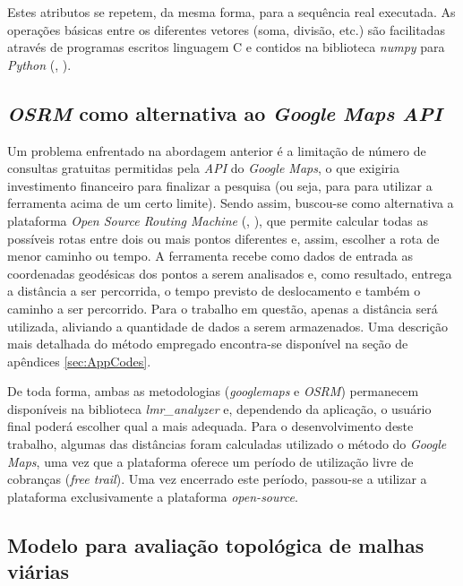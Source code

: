 Estes atributos se repetem, da mesma forma, para a sequência real executada. 
As operações básicas entre os diferentes vetores (soma, divisão, etc.) são facilitadas através de programas escritos linguagem C e contidos na biblioteca \textit{numpy} para \textit{Python} (, \citeyear{harris2020array}).

\subsection{\textit{OSRM} como alternativa ao \textit{Google Maps API}}

Um problema enfrentado na abordagem anterior é a limitação de número de consultas gratuitas permitidas pela \textit{API} do \textit{Google Maps}, o que exigiria investimento financeiro para finalizar a pesquisa (ou seja, para para utilizar a ferramenta acima de um certo limite).
Sendo assim, buscou-se como alternativa a plataforma \textit{Open Source Routing Machine} (, \citeyear{luxen2011real}), que permite calcular todas as possíveis rotas entre dois ou mais pontos diferentes e, assim, escolher a rota de menor caminho ou tempo.
%
A ferramenta recebe como dados de entrada as coordenadas geodésicas dos pontos a serem analisados e, como resultado, entrega a distância a ser percorrida, o tempo previsto de deslocamento e também o caminho a ser percorrido.
Para o trabalho em questão, apenas a distância será utilizada, aliviando a quantidade de dados a serem armazenados.
Uma descrição mais detalhada do método empregado encontra-se disponível na seção de apêndices \ref{sec:AppCodes}.

De toda forma, ambas as metodologias (\textit{googlemaps} e \textit{OSRM}) permanecem disponíveis na biblioteca \textit{lmr\_analyzer} e, dependendo da aplicação, o usuário final poderá escolher qual a mais adequada.
%
Para o desenvolvimento deste trabalho, algumas das distâncias foram calculadas utilizado o método do \textit{Google Maps}, uma vez que a plataforma oferece um período de utilização livre de cobranças (\textit{free trail}).
Uma vez encerrado este período, passou-se a utilizar a plataforma exclusivamente a plataforma \textit{open-source}.

\subsection{Modelo para avaliação topológica de malhas viárias}

